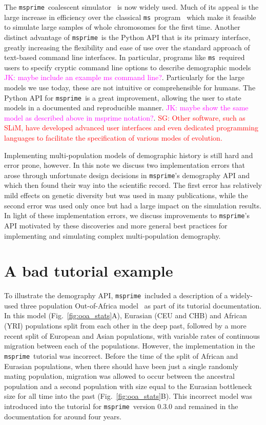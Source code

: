 \documentclass{article}
\newcommand{\msprime}[0]{\texttt{msprime}}
\newcommand{\ms}[0]{\texttt{ms}}
\newcommand{\sgcomment}[1]{{\textcolor{red}{SG: #1}}}
\newcommand{\jkcomment}[1]{{\textcolor{magenta}{JK: #1}}}
\begin{document}
The \msprime\ coalescent
simulator~\citep{kelleher2016efficient,nelson2020accounting,kelleher2020coalescent}
is now widely used. Much of its appeal is the large increase in efficiency over the classical
\ms\ program~\citep{hudson2002generating} which make it feasible to simulate large
samples of whole chromosomes for the first time. Another distinct advantage
of \msprime\ is the Python API that is its primary interface, greatly
increasing the flexibility and ease of use over the standard approach of
text-based command line interfaces. In particular, programs like \ms\
required users to specify cryptic command line options to describe demographic
models \jkcomment{maybe include an example ms command line?}. Particularly for
the large models we use today, these are not intuitive or comprehensible for humans.
The Python API for \msprime\ is a great improvement, allowing the user to
state models in a documented and reproducible manner. \jkcomment{maybe show
the same model as described above in msprime notation?}. \sgcomment{Other software, such as SLiM, 
have developed advanced user interfaces and even dedicated programming languages 
to facilitate the specification of various modes of evolution.\cite{}
}

Implementing multi-population models of demographic history is still hard and error
prone, however. In this note we discuss two implementation errors that arose through
unfortunate design decisions in \msprime's demography API and which then found their way
into the scientific record. The first error has relatively mild effects on genetic diversity but was 
used in many publications, while the second error was used only once but had a large impact on the 
simulation results.  
In light of these implementation errors, we discuss improvements to \msprime's API motivated by these
discoveries and more general best practices for implementing and simulating complex multi-population
demography.

\section{A bad tutorial example}

To illustrate the demography API, \msprime\ included a description of a widely-used
three population Out-of-Africa model~\citep{gutenkunst2009inferring}
as part of its tutorial documentation. In this model (Fig.~\ref{fig:ooa_stats}A),
Eurasian (CEU and CHB) and African (YRI) populations split from each other in the deep past,
followed by a more recent split of European and Asian populations, with variable rates of
continuous migration between each of the populations. However, the implementation in the
\msprime\ tutorial was incorrect. Before the time of the split of African and Eurasian
populations, when there should have been just a single randomly mating population, migration was
allowed to occur between the ancestral population and a second population with size equal to
the Eurasian bottleneck size for all time into the past
(Fig.~\ref{fig:ooa_stats}B). This incorrect model was introduced into
the tutorial for \msprime\ version 0.3.0 and remained in the documentation for
around four years.
\end{document}
